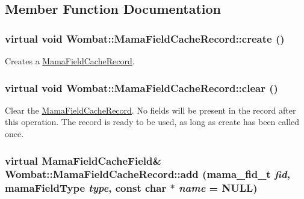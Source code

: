 \subsection{Member Function Documentation}
\hypertarget{classWombat_1_1MamaFieldCacheRecord_add08406b276baa59a6d9cb874601542e}{
\subsubsection[{create}]{\setlength{\rightskip}{0pt plus 5cm}virtual void Wombat::MamaFieldCacheRecord::create ()}}
\label{classWombat_1_1MamaFieldCacheRecord_add08406b276baa59a6d9cb874601542e}


Creates a {\ttfamily \hyperlink{classWombat_1_1MamaFieldCacheRecord}{MamaFieldCacheRecord}}. \hypertarget{classWombat_1_1MamaFieldCacheRecord_a206453bd98fe5f534609602f21041f0e}{
\subsubsection[{clear}]{\setlength{\rightskip}{0pt plus 5cm}virtual void Wombat::MamaFieldCacheRecord::clear ()}}
\label{classWombat_1_1MamaFieldCacheRecord_a206453bd98fe5f534609602f21041f0e}


Clear the {\ttfamily \hyperlink{classWombat_1_1MamaFieldCacheRecord}{MamaFieldCacheRecord}}. No fields will be present in the record after this operation. The record is ready to be used, as long as create has been called once. \hypertarget{classWombat_1_1MamaFieldCacheRecord_a0f473ab50b75ac75bbdeeb3bbf0ada23}{
\subsubsection[{add}]{\setlength{\rightskip}{0pt plus 5cm}virtual {\bf MamaFieldCacheField}\& Wombat::MamaFieldCacheRecord::add (mama\_\-fid\_\-t {\em fid}, \/  mamaFieldType {\em type}, \/  const char $\ast$ {\em name} = {\ttfamily NULL})}}
\label{classWombat_1_1MamaFieldCacheRecord_a0f473ab50b75ac75bbdeeb3bbf0ada23}


